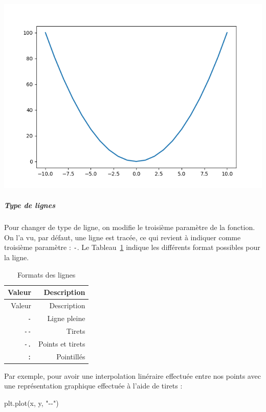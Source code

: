 \documentclass[
  12pt,
]{book}
\newenvironment{Shaded}{\begin{snugshade}}{\end{snugshade}}
\newcommand{\NormalTok}[1]{#1}
\newcommand{\StringTok}[1]{\textcolor[rgb]{0.31,0.60,0.02}{#1}}
\numberwithin{equation}{section}
\numberwithin{countremarque}{section}
\begin{document}
\begin{center}\includegraphics[width=9.03in]{figs/pyplot/lignes_epaisseur} \end{center}

\subparagraph{Type de lignes}\label{type-de-lignes}

Pour changer de type de ligne, on modifie le troisième paramètre de la fonction. On l'a vu, par défaut, une ligne est tracée, ce qui revient à indiquer comme troisième paramètre : \texttt{\textquotesingle{}-\textquotesingle{}}. Le Tableau~\ref{tab:fmt-lignes} indique les différents format possibles pour la ligne.

\begin{longtable}[]{@{}rr@{}}
\caption{\label{tab:fmt-lignes} Formats des lignes}\tabularnewline
\toprule\noalign{}
Valeur & Description \\
\midrule\noalign{}
\endfirsthead
\toprule\noalign{}
Valeur & Description \\
\midrule\noalign{}
\endhead
\bottomrule\noalign{}
\endlastfoot
\texttt{-} & Ligne pleine \\
\texttt{-\/-} & Tirets \\
\texttt{-.} & Points et tirets \\
\texttt{:} & Pointillés \\
\end{longtable}

Par exemple, pour avoir une interpolation linéraire effectuée entre nos points avec une représentation graphique effectuée à l'aide de tirets :

\begin{Shaded}
\begin{Highlighting}[]
\NormalTok{plt.plot(x, y, }\StringTok{"{-}{-}"}\NormalTok{)}
\end{Highlighting}
\end{Shaded}
\end{document}
